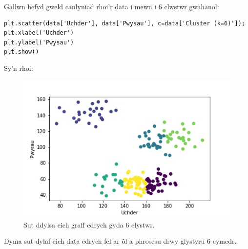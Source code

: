 Gallwn hefyd gweld canlyniad rhoi'r data i mewn i 6 clwstwr gwahanol: 

\begin{verbatim}
plt.scatter(data['Uchder'], data['Pwysau'], c=data['Cluster (k=6)']);
plt.xlabel('Uchder')
plt.ylabel('Pwysau')
plt.show()
\end{verbatim}

Sy'n rhoi:

\begin{figure}[H]
\begin{center}
\includegraphics[width=0.7\linewidth]{../img/6clystwrpython.jpeg}
\caption{Sut ddylsa eich graff edrych gyda 6 clystwr.}
\label{fig:6clystwrpython}
\end{center}
\end{figure}

Dyma sut dylaf eich data edrych fel ar \^{o}l a phrosesu drwy glystyru 6-cymedr. 

